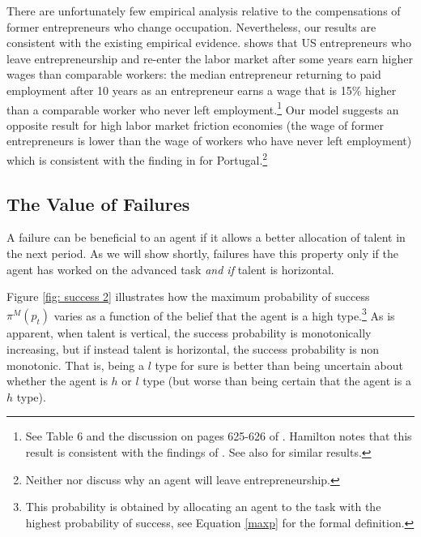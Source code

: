 \documentclass[12pt,american]{paper}
\theoremstyle{remark}
\begin{document}
There are unfortunately few empirical analysis relative to the compensations of former entrepreneurs who change occupation.  Nevertheless, our results are consistent with the existing empirical evidence. \citet{hamilton2000does} shows that US entrepreneurs who leave entrepreneurship and re-enter the labor market after some years earn higher wages than comparable workers: the median entrepreneur returning to paid employment after 10 years as an entrepreneur earns a wage that is 15\% higher than a comparable worker who never left employment.\footnote{%
See Table 6 and the discussion on pages 625-626 of \cite{hamilton2000does}. Hamilton notes that this result is consistent with the findings of \cite{evans1990}. See also \cite{daly2015long} for similar results.} Our model suggests an opposite result for high labor market friction economies (the wage of former entrepreneurs is lower than the wage of workers who have never left employment) which is consistent with the finding in \citet*{baptista2012former} for Portugal.\footnote{Neither \citet{hamilton2000does} nor \citet*{baptista2012former} discuss why an agent will leave entrepreneurship.}


\subsection{The Value of Failures}
A failure can be beneficial to an agent if it allows a better allocation of talent in the next period. As we will show shortly, failures have this property only if the agent has worked on the advanced task  \textit{and if} talent is horizontal. 

 Figure \ref{fig: success 2} illustrates how the maximum probability of success $\pi^M(p_t)$  varies as a function of the belief that the agent is a high type.\footnote{This probability is obtained by allocating an agent to the task with the highest probability of success, see Equation \ref{maxp} for the formal definition.} As is apparent,  when talent is vertical, the success probability is monotonically increasing, but if instead talent is horizontal, the success probability is non monotonic. That is, being  a $l$ type  for sure is better than being uncertain about whether the agent is $h$ or $l$ type (but worse than being certain that the agent is a $h$ type).
\end{document}
